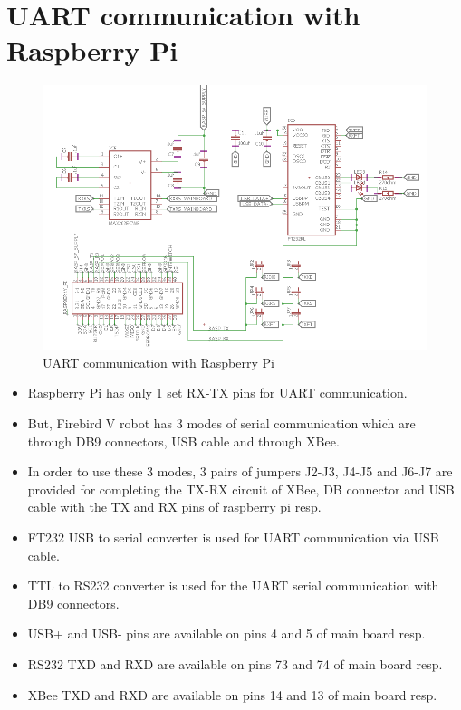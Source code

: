 \documentclass[a4paper,12pt,oneside]{book}
\begin{document}
\section{\textbf{UART communication with Raspberry Pi}}
\begin{figure}[h]
	\includegraphics[width=1\textwidth]{UART}
	\caption{UART communication with Raspberry Pi}
\end{figure}
\hfill
\begin{itemize}
	\item {Raspberry Pi has only 1 set RX-TX pins for UART communication.}
	\item {But, Firebird V robot has 3 modes of serial communication which are through DB9 connectors, USB cable and through XBee.}
	\item {In order to use these 3 modes, 3 pairs of jumpers J2-J3, J4-J5 and J6-J7 are provided for completing the TX-RX circuit of XBee, DB connector and USB cable with the TX and RX pins of raspberry pi resp.}
	\item { FT232 USB to serial converter is used for UART communication via USB cable.}
	\item { TTL to RS232 converter is used for the UART serial communication with DB9 connectors.}
	\item {USB+ and USB- pins are available on pins 4 and 5 of main board resp.}
    \item {RS232 TXD and RXD are available on pins 73 and 74 of main board resp.}
     \item {XBee TXD and RXD are available on pins 14 and 13 of main board resp.}
	
\end{itemize}
\pagebreak
\end{document}
